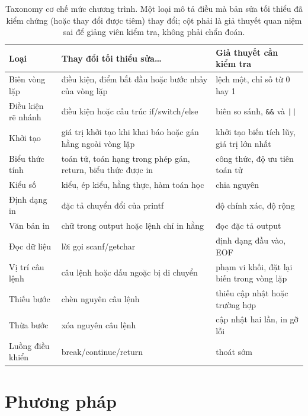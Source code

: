 \begin{table}[t]
\centering
\caption{Taxonomy cơ chế mức chương trình. Một loại mô tả điều mà bản sửa tối thiểu đã kiểm chứng (hoặc thay đổi được tiêm) thay đổi; cột phải là giả thuyết quan niệm sai để giảng viên kiểm tra, không phải chẩn đoán.}\label{tab:taxonomy}
\small
\begin{tabular}{p{2.9cm}p{4.9cm}p{4.6cm}}
\toprule
Loại & Thay đổi tối thiểu sửa\dots & Giả thuyết cần kiểm tra \\
\midrule
Biên vòng lặp & điều kiện, điểm bắt đầu hoặc bước nhảy của vòng lặp & lệch một, chỉ số từ 0 hay 1 \\
Điều kiện rẽ nhánh & điều kiện hoặc cấu trúc if/switch/else & biên so sánh, \texttt{\&\&} và \texttt{||} \\
Khởi tạo & giá trị khởi tạo khi khai báo hoặc gán hằng ngoài vòng lặp & khởi tạo biến tích lũy, giá trị lớn nhất \\
Biểu thức tính & toán tử, toán hạng trong phép gán, return, biểu thức được in & công thức, độ ưu tiên toán tử \\
Kiểu số & kiểu, ép kiểu, hằng thực, hàm toán học & chia nguyên \\
Định dạng in & đặc tả chuyển đổi của printf & độ chính xác, độ rộng \\
Văn bản in & chữ trong output hoặc lệnh chỉ in hằng & đọc đặc tả output \\
Đọc dữ liệu & lời gọi scanf/getchar & định dạng đầu vào, EOF \\
Vị trí câu lệnh & câu lệnh hoặc dấu ngoặc bị di chuyển & phạm vi khối, đặt lại biến trong vòng lặp \\
Thiếu bước & chèn nguyên câu lệnh & thiếu cập nhật hoặc trường hợp \\
Thừa bước & xóa nguyên câu lệnh & cập nhật hai lần, in gỡ lỗi \\
Luồng điều khiển & break/continue/return & thoát sớm \\
\bottomrule
\end{tabular}
\end{table}

\section{Phương pháp}\label{sec:methods}

